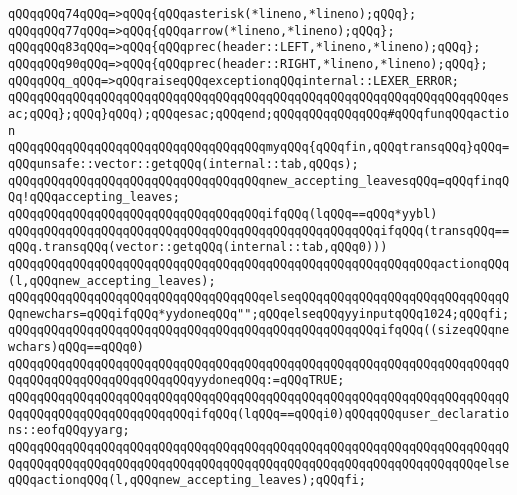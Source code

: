 \verb|qQQqqQQq74qQQq=>qQQq{qQQqasterisk(*lineno,*lineno);qQQq};|\newline
\verb|qQQqqQQq77qQQq=>qQQq{qQQqarrow(*lineno,*lineno);qQQq};|\newline
\verb|qQQqqQQq83qQQq=>qQQq{qQQqprec(header::LEFT,*lineno,*lineno);qQQq};|\newline
\verb|qQQqqQQq90qQQq=>qQQq{qQQqprec(header::RIGHT,*lineno,*lineno);qQQq};|\newline
\verb|qQQqqQQq_qQQq=>qQQqraiseqQQqexceptionqQQqinternal::LEXER_ERROR;|\newline
\newline
\verb|qQQqqQQqqQQqqQQqqQQqqQQqqQQqqQQqqQQqqQQqqQQqqQQqqQQqqQQqqQQqqQQqqQQqesac;qQQq};qQQq}qQQq);qQQqesac;qQQqend;qQQqqQQqqQQqqQQq#qQQqfunqQQqaction|\newline
\newline
\verb|qQQqqQQqqQQqqQQqqQQqqQQqqQQqqQQqqQQqmyqQQq{qQQqfin,qQQqtransqQQq}qQQq=qQQqunsafe::vector::getqQQq(internal::tab,qQQqs);|\newline
\verb|qQQqqQQqqQQqqQQqqQQqqQQqqQQqqQQqqQQqnew_accepting_leavesqQQq=qQQqfinqQQq!qQQqaccepting_leaves;|\newline
\verb|qQQqqQQqqQQqqQQqqQQqqQQqqQQqqQQqqQQqifqQQq(lqQQq==qQQq*yybl)|\newline
\verb|qQQqqQQqqQQqqQQqqQQqqQQqqQQqqQQqqQQqqQQqqQQqqQQqqQQqifqQQq(transqQQq==qQQq.transqQQq(vector::getqQQq(internal::tab,qQQq0)))|\newline
\verb|qQQqqQQqqQQqqQQqqQQqqQQqqQQqqQQqqQQqqQQqqQQqqQQqqQQqqQQqqQQqactionqQQq(l,qQQqnew_accepting_leaves);|\newline
\verb|qQQqqQQqqQQqqQQqqQQqqQQqqQQqqQQqqQQqelseqQQqqQQqqQQqqQQqqQQqqQQqqQQqqQQqnewchars=qQQqifqQQq*yydoneqQQq"";qQQqelseqQQqyyinputqQQq1024;qQQqfi;|\newline
\verb|qQQqqQQqqQQqqQQqqQQqqQQqqQQqqQQqqQQqqQQqqQQqqQQqqQQqifqQQq((sizeqQQqnewchars)qQQq==qQQq0)|\newline
\verb|qQQqqQQqqQQqqQQqqQQqqQQqqQQqqQQqqQQqqQQqqQQqqQQqqQQqqQQqqQQqqQQqqQQqqQQqqQQqqQQqqQQqqQQqqQQqqQQqyydoneqQQq:=qQQqTRUE;|\newline
\verb|qQQqqQQqqQQqqQQqqQQqqQQqqQQqqQQqqQQqqQQqqQQqqQQqqQQqqQQqqQQqqQQqqQQqqQQqqQQqqQQqqQQqqQQqqQQqqQQqifqQQq(lqQQq==qQQqi0)qQQqqQQquser_declarations::eofqQQqyyarg;|\newline
\verb|qQQqqQQqqQQqqQQqqQQqqQQqqQQqqQQqqQQqqQQqqQQqqQQqqQQqqQQqqQQqqQQqqQQqqQQqqQQqqQQqqQQqqQQqqQQqqQQqqQQqqQQqqQQqqQQqqQQqqQQqqQQqqQQqqQQqqQQqelseqQQqactionqQQq(l,qQQqnew_accepting_leaves);qQQqfi;|\newline
